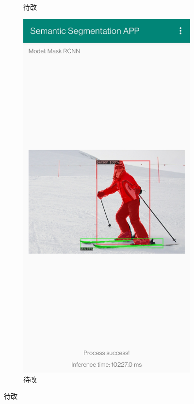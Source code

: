 \begin{figure}[htbp]
\begin{subfigure}[t]{0.3\linewidth}
        \caption{待改
        }\label{resultmaskrcnn}
    \end{subfigure}
    \begin{subfigure}[t]{0.3\linewidth}
        \includegraphics[width=1\textwidth]{figures/ski.jpg}
        \caption{待改}\label{resultskimaskrcnn}
    \end{subfigure}
    \caption{待改}\label{result2}
\end{figure}

